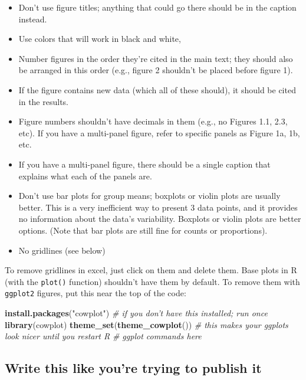 \documentclass[]{book}
\newenvironment{Shaded}{\begin{snugshade}}{\end{snugshade}}
\newcommand{\KeywordTok}[1]{\textcolor[rgb]{0.13,0.29,0.53}{\textbf{#1}}}
\newcommand{\StringTok}[1]{\textcolor[rgb]{0.31,0.60,0.02}{#1}}
\newcommand{\CommentTok}[1]{\textcolor[rgb]{0.56,0.35,0.01}{\textit{#1}}}
\newcommand{\NormalTok}[1]{#1}
\providecommand{\tightlist}{%
  \setlength{\itemsep}{0pt}\setlength{\parskip}{0pt}}
\begin{document}
\begin{itemize}
\tightlist
\item
  Don't use figure titles; anything that could go there should be in the
  caption instead.
\item
  Use colors that will work in black and white,
\item
  Number figures in the order they're cited in the main text; they
  should also be arranged in this order (e.g., figure 2 shouldn't be
  placed before figure 1).
\item
  If the figure contains new data (which all of these should), it should
  be cited in the results.
\item
  Figure numbers shouldn't have decimals in them (e.g., no Figures 1.1,
  2.3, etc). If you have a multi-panel figure, refer to specific panels
  as Figure 1a, 1b, etc.
\item
  If you have a multi-panel figure, there should be a single caption
  that explains what each of the panels are.
\item
  Don't use bar plots for group means; boxplots or violin plots are
  usually better. This is a very inefficient way to present 3 data
  points, and it provides no information about the data's variability.
  Boxplots or violin plots are better options. (Note that bar plots are
  still fine for counts or proportions).
\item
  No gridlines (see below)
\end{itemize}

To remove gridlines in excel, just click on them and delete them. Base
plots in R (with the \texttt{plot()} function) shouldn't have them by
default. To remove them with \texttt{ggplot2} figures, put this near the
top of the code:

\begin{Shaded}
\begin{Highlighting}[]
\KeywordTok{install.packages}\NormalTok{(}\StringTok{"cowplot"}\NormalTok{) }\CommentTok{# if you don't have this installed; run once}
\KeywordTok{library}\NormalTok{(cowplot)}
\KeywordTok{theme_set}\NormalTok{(}\KeywordTok{theme_cowplot}\NormalTok{()) }\CommentTok{# this makes your ggplots look nicer until you restart R}
\CommentTok{# ggplot commands here}
\end{Highlighting}
\end{Shaded}

\subsection{Write this like you're trying to publish
it}\label{write-this-like-youre-trying-to-publish-it}
\end{document}
